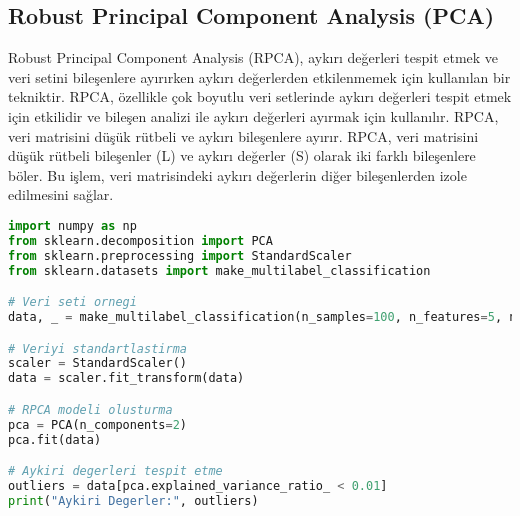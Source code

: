 \subsection{Robust Principal Component Analysis (PCA)}
Robust Principal Component Analysis (RPCA), aykırı değerleri tespit etmek ve veri setini bileşenlere ayırırken aykırı değerlerden etkilenmemek için kullanılan bir tekniktir. RPCA, özellikle çok boyutlu veri setlerinde aykırı değerleri tespit etmek için etkilidir ve bileşen analizi ile aykırı değerleri ayırmak için kullanılır. RPCA, veri matrisini düşük rütbeli ve aykırı bileşenlere ayırır. RPCA, veri matrisini düşük rütbeli bileşenler (L) ve aykırı değerler (S) olarak iki farklı bileşenlere böler. Bu işlem, veri matrisindeki aykırı değerlerin diğer bileşenlerden izole edilmesini sağlar.

\begin{lstlisting}[language=Python]
import numpy as np
from sklearn.decomposition import PCA
from sklearn.preprocessing import StandardScaler
from sklearn.datasets import make_multilabel_classification

# Veri seti ornegi
data, _ = make_multilabel_classification(n_samples=100, n_features=5, n_classes=2, n_labels=2, n_clusters_per_class=1, random_state=42)

# Veriyi standartlastirma
scaler = StandardScaler()
data = scaler.fit_transform(data)

# RPCA modeli olusturma
pca = PCA(n_components=2)
pca.fit(data)

# Aykiri degerleri tespit etme
outliers = data[pca.explained_variance_ratio_ < 0.01]
print("Aykiri Degerler:", outliers)
\end{lstlisting}

\newpage